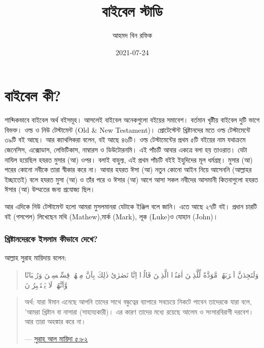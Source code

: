 \documentclass[
]{book}
\title{বাইবেল স্টাডি}
\author{আহমদ বিন রফিক}
\date{2021-07-24}
\begin{document}
\maketitle

{
\setcounter{tocdepth}{1}
\tableofcontents
}
\hypertarget{about-bible}{%
\chapter*{বাইবেল কী?}\label{about-bible}}

শাব্দিকভাবে বাইবেল অর্থ বইসমূহ। আসলেই বাইবেল অনেকগুলো বইয়ের সমাবেশ। বর্তমান খৃষ্টীয় বাইবেল দুটি ভাগে বিভক্ত। ওল্ড ও নিউ টেস্টামেন্ট (Old \& New Testament)। প্রোটেস্টেন্ট খ্রিষ্টানদের মতে ওল্ড টেস্টামেন্টে ৩৯টি বই আছে। আর ক্যাথলিকরা বলেন, বই আছে ৪৬টি। ওল্ড টেস্টামেন্টের প্রথম ৫টি বইয়ের নাম যথাক্রমে জেনেসিস, এক্সোডাস, লেভিটিকাস, নাম্বারস ও ডিউটোরনমি। এই পাঁচটি আবার একত্রে বলা হয় তাওরাত। যেটা নাযিল হয়েছিল হযরত মুসার (আ) ওপর। বলাই বাহুল্য, এই প্রথম পাঁচটি বইই ইহুদিদের মূল ধর্মগ্রন্থ। মুসার (আ) পরের কোনো নবীকে তারা স্বীকার করে না। আবার হযরত ঈসা (আ) নতুন কোনো আইন নিয়ে আসেননি (আল্লাহর ইচ্ছাতেই) বলে হযরত মুসা (আ) ও তাঁর পরে ও ঈসার (আ) আগে আসা সকল নবীদের আসমানী কিতবাগুলো হযরত ঈসার (আ) উম্মতের জন্য প্রযোজ্য ছিল।

আর এদিকে নিউ টেস্টামেন্ট হলো আমরা মুসলমানরা যেটাকে ইঞ্জিল বলে জানি। এতে আছে ২৭টি বই। প্রধান চারটি বই (গসপেল) লিখেছেন মথি (Mathew),মার্ক (Mark), লূক (Luke)ও যোহান (John)।

\hypertarget{islam-on-christians}{%
\subsection*{খ্রিষ্টানদেরকে ইসলাম কীভাবে দেখে?}\label{islam-on-christians}}

আল্লাহ সুরাহ মায়িদায় বলেন:

\begin{quote}
وَلَتَجِدَنَّ اَقۡرَبَهُمۡ مَّوَدَّةً لِّلَّذِيۡنَ اٰمَنُوۡا الَّذِيۡنَ قَالُوۡۤا اِنَّا نَصٰرٰى‌ؕ ذٰلِكَ بِاَنَّ مِنۡهُمۡ قِسِّيۡسِيۡنَ وَرُهۡبَانًا وَّاَنَّهُمۡ لَا يَسۡتَكۡبِرُوۡنَ
\end{quote}

\begin{quote}
অর্থ: যারা ঈমান এনেছে আপনি তাদের সাথে বন্ধুত্বের ব্যাপারে সবচেয়ে নিকটে পাবেন তাদেরকে যারা বলে, 'আমরা খ্রিষ্টান বা নাসারা (সাহায্যকারী)। এর কারণ তাদের মধ্যে রয়েছে আলেম ও সংসারবিরাগী দরবেশ। আর তারা অহঙ্কার করে না।

--- \href{http://tafheembangla.com/index.php/quran?show=quran\&surah_no=5\&limitstart=81}{সুরাহ আল মায়িদা ৫:৮২}
\end{quote}
\end{document}
